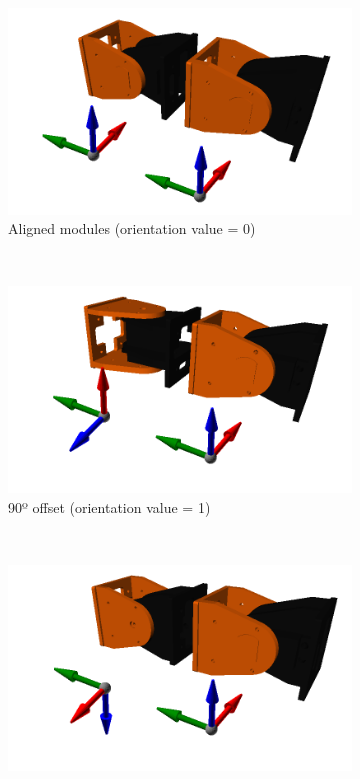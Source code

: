 \begin{figure}[h]
		\centering
        \begin{subfigure}[b]{0.35\textwidth}
                \centering
                \includegraphics[width=\textwidth]{images/Conf_example_01.png}
                \caption{Aligned modules (orientation value = 0)}
                \label{fig:config_example1}
        \end{subfigure}
        ~
        \begin{subfigure}[b]{0.35\textwidth}
                \centering
                \includegraphics[width=\textwidth]{images/Conf_example_04.png}
                \caption{90º offset (orientation value = 1)}
                \label{fig:config_example2}
        \end{subfigure}
        ~
        \begin{subfigure}[b]{0.35\textwidth}
         	   \centering
                \includegraphics[width=\textwidth]{images/Conf_example_03.png}

\end{subfigure}
\end{figure}

